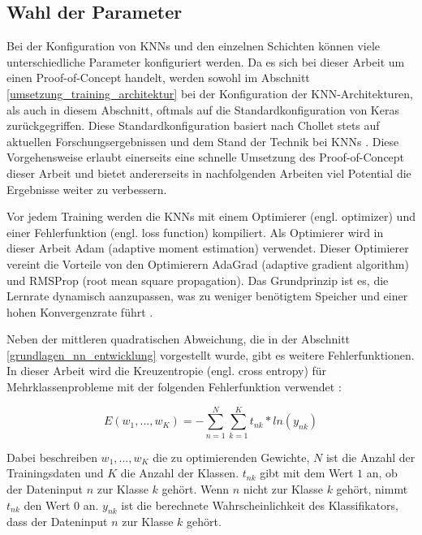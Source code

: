 \subsection{Wahl der Parameter}
\label{umsetzung_training_experimente}

Bei der Konfiguration von \acp{KNN} und den einzelnen Schichten können viele unterschiedliche Parameter konfiguriert werden. Da es sich bei dieser Arbeit um einen Proof-of-Concept handelt, werden sowohl im Abschnitt \ref{umsetzung_training_architektur} bei der Konfiguration der \ac{KNN}-Architekturen, als auch in diesem Abschnitt, oftmals auf die Standardkonfiguration von Keras zurückgegriffen. Diese Standardkonfiguration basiert nach Chollet stets auf aktuellen Forschungsergebnissen und dem Stand der Technik bei \acp{KNN} \cite{chollet2015keras}. Diese Vorgehensweise erlaubt einerseits eine schnelle Umsetzung des Proof-of-Concept dieser Arbeit und bietet andererseits in nachfolgenden Arbeiten viel Potential die Ergebnisse weiter zu verbessern.

Vor jedem Training werden die \acp{KNN} mit einem Optimierer (engl. optimizer) und einer Fehlerfunktion (engl. loss function) kompiliert. Als Optimierer wird in dieser Arbeit Adam (adaptive moment estimation) verwendet. Dieser Optimierer vereint die Vorteile von den Optimierern AdaGrad (adaptive gradient algorithm) und RMSProp (root mean square propagation). Das Grundprinzip ist es, die Lernrate dynamisch aanzupassen, was zu weniger benötigtem Speicher und einer hohen Konvergenzrate führt \cite{kingma2014adam}.

 Neben der mittleren quadratischen Abweichung, die in der Abschnitt \ref{grundlagen_nn_entwicklung} vorgestellt wurde, gibt es weitere Fehlerfunktionen. In dieser Arbeit wird die Kreuzentropie (engl. cross entropy) für Mehrklassenprobleme mit der folgenden Fehlerfunktion verwendet \cite{bishop2006pattern}:

\begin{equation}
E(w_1, ..., w_K) = -\sum _{n=1}^N \sum _{k=1}^K t_{nk} * ln(y_{nk})
\end{equation}

Dabei beschreiben $w_1, ..., w_K$ die zu optimierenden Gewichte, $N$ ist die Anzahl der Trainingsdaten und $K$ die Anzahl der Klassen. $t_{nk}$ gibt mit dem Wert $1$ an, ob der Dateninput $n$ zur Klasse $k$ gehört. Wenn $n$ nicht zur Klasse $k$ gehört, nimmt $t_{nk}$ den Wert $0$ an. $y_{nk}$ ist die berechnete Wahrscheinlichkeit des Klassifikators, dass der Dateninput $n$ zur Klasse $k$ gehört.

